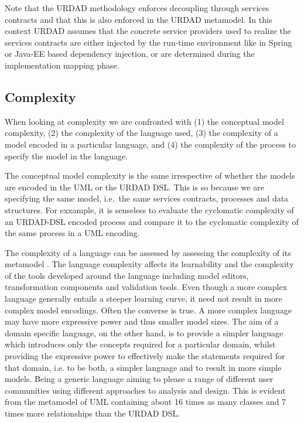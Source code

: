Note that the URDAD methodology enforces decoupling through services contracts and that this is also enforced in the URDAD metamodel. In this context URDAD assumes that the concrete service providers used to realize the services contracts are either injected by the run-time environment like in Spring or Java-EE based dependency injection, or are determined during the implementation mapping phase.




\subsection{Complexity}

When looking at complexity we are confronted with (1) the conceptual model complexity, (2) the complexity of the language used, (3) the complexity of a model encoded in a particular language, and (4) the complexity of the process to specify the model in the language. 

The conceptual model complexity is the same irrespective of whether the models are encoded in the UML or the URDAD DSL. This is so because we are specifying the same model, i.e.\ the same services contracts, processes and data structures. For exxample, it is senseless to evaluate the cyclomatic complexity \cite{mccabe_complexity_1976} of an URDAD-DSL encoded process and compare it to the cyclomatic complexity of the same process in a UML encoding.

The complexity of a language can be assessed by assessing the complexity of its metamodel \cite{mohagheghi_evaluating_2007}. The language complexity affects its learnability and the complexity of the tools developed around the language including model editors, transformation components and validation tools. Even though a more complex language generally entails a steeper learning curve, it need not result in more complex model encodings. Often the converse is true. A more complex language may have more expressive power and thus smaller model sizes. The aim of a domain specific language, on the other hand, is to provide a simpler language which introduces only the concepts required for a particular domain, whilst providing the expressive power to effectively make the statements required for that domain, i.e. to be both, a simpler language and to result in more simple models. Being a generic language aiming to please a range of different user communities using different approaches to analysis and design. This is evident from the metamodel of UML containing about 16 times as many classes and 7 times more relationships than the URDAD DSL.

